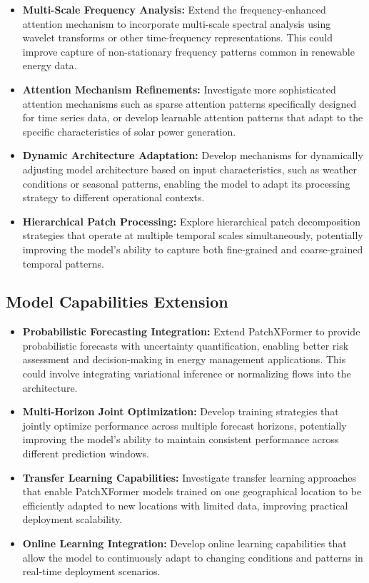 \documentclass[12pt]{uomthesis}
\begin{document}
\begin{itemize}
    \item \textbf{Multi-Scale Frequency Analysis:} Extend the frequency-enhanced attention mechanism to incorporate multi-scale spectral analysis using wavelet transforms or other time-frequency representations. This could improve capture of non-stationary frequency patterns common in renewable energy data.
    
    \item \textbf{Attention Mechanism Refinements:} Investigate more sophisticated attention mechanisms such as sparse attention patterns specifically designed for time series data, or develop learnable attention patterns that adapt to the specific characteristics of solar power generation.
    
    \item \textbf{Dynamic Architecture Adaptation:} Develop mechanisms for dynamically adjusting model architecture based on input characteristics, such as weather conditions or seasonal patterns, enabling the model to adapt its processing strategy to different operational contexts.
    
    \item \textbf{Hierarchical Patch Processing:} Explore hierarchical patch decomposition strategies that operate at multiple temporal scales simultaneously, potentially improving the model's ability to capture both fine-grained and coarse-grained temporal patterns.
\end{itemize}

\subsection{Model Capabilities Extension}

\begin{itemize}
    \item \textbf{Probabilistic Forecasting Integration:} Extend PatchXFormer to provide probabilistic forecasts with uncertainty quantification, enabling better risk assessment and decision-making in energy management applications. This could involve integrating variational inference or normalizing flows into the architecture.
    
    \item \textbf{Multi-Horizon Joint Optimization:} Develop training strategies that jointly optimize performance across multiple forecast horizons, potentially improving the model's ability to maintain consistent performance across different prediction windows.
    
    \item \textbf{Transfer Learning Capabilities:} Investigate transfer learning approaches that enable PatchXFormer models trained on one geographical location to be efficiently adapted to new locations with limited data, improving practical deployment scalability.
    
    \item \textbf{Online Learning Integration:} Develop online learning capabilities that allow the model to continuously adapt to changing conditions and patterns in real-time deployment scenarios.
\end{itemize}
\end{document}

